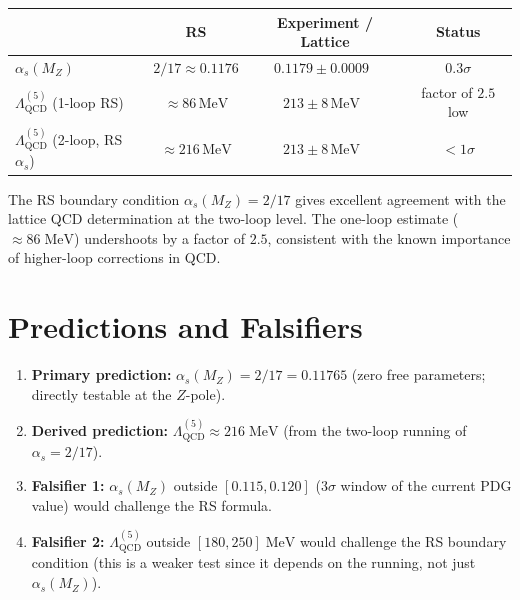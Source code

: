 \documentclass[12pt,a4paper]{article}
\theoremstyle{definition}
\theoremstyle{remark}
\begin{document}
\begin{center}
\renewcommand{\arraystretch}{1.3}
\begin{tabular}{lccc}
\toprule
& \textbf{RS} & \textbf{Experiment / Lattice} & \textbf{Status}\\
\midrule
$\alpha_s(M_Z)$ & $2/17 \approx 0.1176$ & $0.1179 \pm 0.0009$~\cite{PDG2024} & $0.3\sigma$ \\
$\Lambda_{\mathrm{QCD}}^{(5)}$ (1-loop RS) & $\approx 86\,\mathrm{MeV}$ & $213 \pm 8\,\mathrm{MeV}$~\cite{FLAG} & factor of $2.5$ low \\
$\Lambda_{\mathrm{QCD}}^{(5)}$ (2-loop, RS $\alpha_s$) & $\approx 216\,\mathrm{MeV}$ & $213 \pm 8\,\mathrm{MeV}$~\cite{FLAG} & $<1\sigma$ \\
\bottomrule
\end{tabular}
\end{center}

The RS boundary condition $\alpha_s(M_Z) = 2/17$ gives excellent agreement
with the lattice QCD determination at the two-loop level.  The one-loop
estimate ($\approx 86\;\mathrm{MeV}$) undershoots by a factor of $2.5$,
consistent with the known importance of higher-loop corrections in QCD.

\section{Predictions and Falsifiers}
\label{sec:falsifiers}

\begin{enumerate}[label=\textbf{(\alph*)}]
\item \textbf{Primary prediction:} $\alpha_s(M_Z) = 2/17 = 0.11765$
  (zero free parameters; directly testable at the $Z$-pole).
\item \textbf{Derived prediction:} $\Lambda_{\mathrm{QCD}}^{(5)}
  \approx 216\;\mathrm{MeV}$ (from the two-loop running of $\alpha_s = 2/17$).
\item \textbf{Falsifier 1:} $\alpha_s(M_Z)$ outside $[0.115, 0.120]$
  ($3\sigma$ window of the current PDG value) would challenge the RS formula.
\item \textbf{Falsifier 2:} $\Lambda_{\mathrm{QCD}}^{(5)}$ outside
  $[180, 250]\;\mathrm{MeV}$ would challenge the RS boundary condition
  (this is a weaker test since it depends on the running, not just $\alpha_s(M_Z)$).
\end{enumerate}
\end{document}
